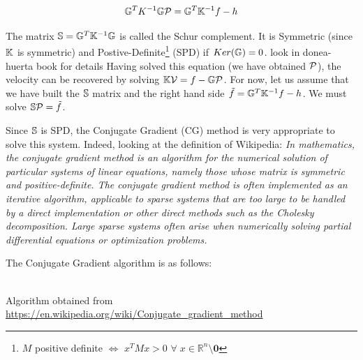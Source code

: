 \begin{mdframed}[backgroundcolor=blue!5]
\[
{\mathbb{G}}^T K^{-1} {\mathbb{G}} {\cal P} = {\mathbb{G}}^T {\mathbb{K}}^{-1} f - h 
\]
\end{mdframed}
The matrix ${\mathbb{S}}= {\mathbb{G}}^T {\mathbb{K}}^{-1} {\mathbb{G}} $ is called the Schur complement.  
It is Symmetric (since ${\mathbb{K}}$ is symmetric) and  Postive-Definite\footnote{$M$ 
positive definite $\iff$ $x^TMx>0$ $\forall \; x\in \mathbb{R}^n \setminus {\bm 0}$ }
(SPD)  if $Ker({{\mathbb{G}}})=0$. 
{\color{red} look in donea-huerta book for details}
Having solved this equation (we have obtained ${\cal P}$), the velocity can be recovered by solving 
${\mathbb{K}} {\cal V} =f- {\mathbb{G}} {\cal P}$. 
For now, let us assume that we have built the ${\mathbb{S}}$ matrix and the right hand side $\tilde{f}={\mathbb{G}}^T {\mathbb{K}}^{-1} f - h$.
We must solve ${\mathbb{S}} {\cal P} = \tilde{f}$.

 
Since ${\mathbb{S}}$ is SPD, the Conjugate Gradient (CG) method is very appropriate to solve this system. 
Indeed, looking at the definition of Wikipedia: {\it In mathematics, the conjugate gradient method is an algorithm for the numerical solution of particular systems of linear equations, namely those whose matrix is symmetric and positive-definite. The conjugate gradient method is often implemented as an iterative algorithm, applicable to sparse systems that are too large to be handled by a direct implementation or other direct methods such as the Cholesky decomposition. Large sparse systems often arise when numerically solving partial differential equations or optimization problems.}

The Conjugate Gradient algorithm is as follows:

\begin{center}
\\
Algorithm obtained from \url{https://en.wikipedia.org/wiki/Conjugate\_gradient\_method}
\end{center}

